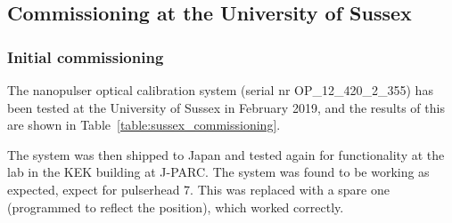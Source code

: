 

\subsection*{Commissioning at the University of Sussex}

\subsubsection*{Initial commissioning}

The nanopulser optical calibration system (serial nr OP\_12\_420\_2\_355) has been tested at the University of Sussex in February 2019, and the results of this are shown in Table~\ref{table:sussex_commissioning}.

The system was then shipped to Japan and tested again for functionality at the \jsns lab in the KEK building at J-PARC. The system was found to be working as expected, expect for pulserhead 7. This was replaced with a spare one (programmed to reflect the position), which worked correctly.

